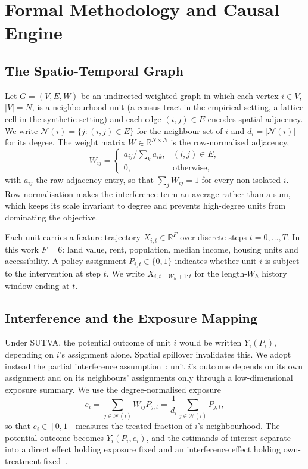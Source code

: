\section{Formal Methodology and Causal Engine}
\label{sec:methodology}

\subsection{The Spatio-Temporal Graph}

Let $G = (V, E, W)$ be an undirected weighted graph in which each vertex
$i \in V$, $|V| = N$, is a neighbourhood unit (a census tract in the empirical
setting, a lattice cell in the synthetic setting) and each edge
$(i,j) \in E$ encodes spatial adjacency. We write $\mathcal{N}(i) =
\{ j : (i,j) \in E \}$ for the neighbour set of $i$ and $d_i = |\mathcal{N}(i)|$
for its degree. The weight matrix $W \in \mathbb{R}^{N \times N}$ is the
row-normalised adjacency,
\begin{equation}
  W_{ij} =
  \begin{cases}
    a_{ij} \big/ \sum_{k} a_{ik}, & (i,j) \in E,\\[2pt]
    0, & \text{otherwise,}
  \end{cases}
  \label{eq:weights}
\end{equation}
with $a_{ij}$ the raw adjacency entry, so that $\sum_{j} W_{ij} = 1$ for every
non-isolated $i$. Row normalisation makes the interference term an average
rather than a sum, which keeps its scale invariant to degree and prevents
high-degree units from dominating the objective.

Each unit carries a feature trajectory $X_{i,t} \in \mathbb{R}^{F}$ over
discrete steps $t = 0, \dots, T$. In this work $F = 6$: land value, rent,
population, median income, housing units and accessibility. A policy assignment
$P_{i,t} \in \{0,1\}$ indicates whether unit $i$ is subject to the intervention
at step $t$. We write $X_{i,t-W_h+1:t}$ for the length-$W_h$ history window
ending at $t$.

\subsection{Interference and the Exposure Mapping}

Under SUTVA, the potential outcome of unit $i$ would be written
$Y_i(P_i)$, depending on $i$'s assignment alone. Spatial spillover invalidates
this. We adopt instead the partial interference
assumption~\cite{hudgens2008,ogburn2014}: unit $i$'s outcome depends on its own
assignment and on its neighbours' assignments only through a low-dimensional
exposure summary. We use the degree-normalised exposure
\begin{equation}
  e_i = \sum_{j \in \mathcal{N}(i)} W_{ij} P_{j,t}
      = \frac{1}{d_i} \sum_{j \in \mathcal{N}(i)} P_{j,t},
  \label{eq:exposure}
\end{equation}
so that $e_i \in [0,1]$ measures the treated fraction of $i$'s neighbourhood.
The potential outcome becomes $Y_i(P_i, e_i)$, and the estimands of interest
separate into a direct effect holding exposure fixed and an interference effect
holding own-treatment fixed~\cite{forastiere2021}.

